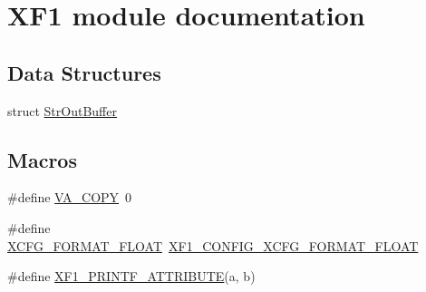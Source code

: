 \hypertarget{group___x_f1__module}{}\section{X\+F1 module documentation}
\label{group___x_f1__module}
\subsection*{Data Structures}
\begin{DoxyCompactItemize}
\item 
struct \hyperlink{struct_str_out_buffer}{Str\+Out\+Buffer}
\end{DoxyCompactItemize}
\subsection*{Macros}
\begin{DoxyCompactItemize}
\item 
\#define \hyperlink{group___x_f1__module_gae7f59f6cd0e5f8b38da9a6d94372b8be}{V\+A\+\_\+\+C\+O\+PY}~0
\item 
\#define \hyperlink{group___x_f1__module_gaa8062a55530f0cffb8482e915a9bd0f4}{X\+C\+F\+G\+\_\+\+F\+O\+R\+M\+A\+T\+\_\+\+F\+L\+O\+AT}~\hyperlink{_x_f1config_8h_a3f6ecd1da22a1af1e9bc941efdcc8503}{X\+F1\+\_\+\+C\+O\+N\+F\+I\+G\+\_\+\+X\+C\+F\+G\+\_\+\+F\+O\+R\+M\+A\+T\+\_\+\+F\+L\+O\+AT}
\item 
\#define \hyperlink{group___x_f1__module_ga571fdad8bb4eceab59e2c24c5e8b7340}{X\+F1\+\_\+\+P\+R\+I\+N\+T\+F\+\_\+\+A\+T\+T\+R\+I\+B\+U\+TE}(a,  b)
\end{DoxyCompactItemize}
